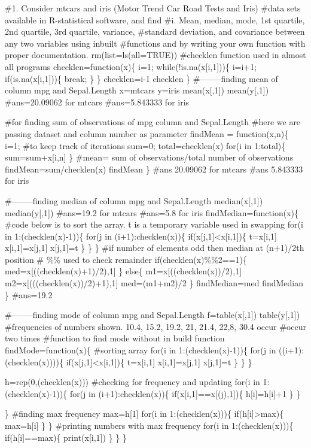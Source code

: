 \documentclass[
]{article}
\author{}
\date{\vspace{-2.5em}}
\begin{document}
\#1. Consider mtcars and iris (Motor Trend Car Road Tests and Iris)
\#data sets available in R-statistical software, and find \#i. Mean,
median, mode, 1st quartile, 2nd quartile, 3rd quartile, variance,
\#standard deviation, and covariance between any two variables using
inbuilt \#functions and by writing your own function with proper
documentation. rm(list=ls(all=TRUE)) \#checklen function used in almost
all programs checklen=function(x)\{ i=1; while(!is.na(x{[}i,1{]}))\{
i=i+1; if(is.na(x{[}i,1{]}))\{ break; \} \} checklen=i-1 checklen \}
\#--------finding mean of column mpg and Sepal.Length x=mtcars y=iris
mean(x{[},1{]}) mean(y{[},1{]}) \#ans=20.09062 for mtcars \#ans=5.843333
for iris

\#for finding sum of observations of mpg column and Sepal.Length \#here
we are passing dataset and column number as parameter findMean =
function(x,n)\{ i=1; \#to keep track of iterations sum=0;
total=checklen(x) for(i in 1:total)\{ sum=sum+x{[}i,n{]} \} \#mean= sum
of observations/total number of observations findMean=sum/checklen(x)
findMean \} \#ans 20.09062 for mtcars \#ans 5.843333 for iris

\#--------finding median of column mpg and Sepal.Length
median(x{[},1{]}) median(y{[},1{]}) \#ans=19.2 for mtcars \#ans=5.8 for
iris findMedian=function(x)\{ \#code below is to sort the array. t is a
temporary variable used in swapping for(i in 1:(checklen(x)-1))\{ for(j
in (i+1):checklen(x))\{ if(x{[}j,1{]}\textless x{[}i,1{]})\{
t=x{[}i,1{]} x{[}i,1{]}=x{[}j,1{]} x{[}j,1{]}=t \} \} \} \#if number of
elements odd then median at (n+1)/2th position \# \%\% used to check
remainder if(checklen(x)\%\%2==1)\{ med=x{[}((checklen(x)+1)/2),1{]} \}
else\{ m1=x{[}((checklen(x))/2),1{]} m2=x{[}(((checklen(x))/2)+1),1{]}
med=(m1+m2)/2 \} findMedian=med findMedian \} \#ans=19.2

\#--------finding mode of column mpg and Sepal.Length f=table(x{[},1{]})
table(y{[},1{]}) \#frequencies of numbers shown. 10.4, 15.2, 19.2, 21,
21.4, 22,8, 30.4 occur \#occur two times \#function to find mode without
in build function findMode=function(x)\{ \#sorting array for(i in
1:(checklen(x)-1))\{ for(j in ((i+1):(checklen(x))))\{
if(x{[}j,1{]}\textless x{[}i,1{]})\{ t=x{[}i,1{]} x{[}i,1{]}=x{[}j,1{]}
x{[}j,1{]}=t \} \} \}

h=rep(0,(checklen(x))) \#checking for frequency and updating for(i in
1:(checklen(x)-1))\{ for(j in (i+1):checklen(x))\{
if(x{[}i,1{]}==x{[}(j),1{]})\{ h{[}i{]}=h{[}i{]}+1 \} \}

\} \#finding max frequency max=h{[}1{]} for(i in 1:(checklen(x)))\{
if(h{[}i{]}\textgreater max)\{ max=h{[}i{]} \} \} \#printing numbers
with max frequency for(i in 1:(checklen(x)))\{ if(h{[}i{]}==max)\{
print(x{[}i,1{]}) \} \} \}
\end{document}
